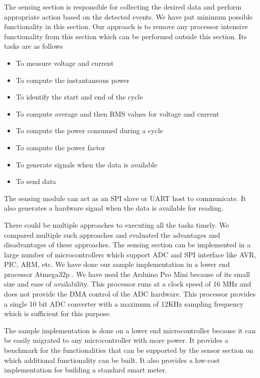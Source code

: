 The sensing section is responsible for collecting the desired data and perform appropriate action based on the detected events. We have put minimum possible functionality in this section. Our approach is to remove any processor intensive functionality from this section which can be performed outside this section. Its tasks are as follows

\begin{itemize}

\item To measure voltage and current
\item To compute the instantaneous power
\item To identify the start and end of the cycle
\item To compute average and then RMS values for voltage and current
\item To compute the power consumed during a cycle
\item To compute the power factor
\item To generate signals when the data is available
\item To send data

\end{itemize}


The sensing module can act as an SPI slave or UART host to communicate. It also generates a hardware signal when the data is available for reading.


There could be multiple approaches to executing all the tasks timely. We compared multiple such approaches and evaluated the advantages and disadvantages of these approaches. The sensing section can be implemented in a large number of microcontrollers which support ADC and SPI interface like AVR, PIC, ARM, etc. We have done our sample implementation in a lower end processor Atmega32p \cite{ATmega328P8bitAVR}. We have used the Arduino Pro Mini because of its small size and ease of availability. This processor runs at a clock speed of 16 MHz and does not provide the DMA control of the ADC hardware. This processor provides a single 10 bit ADC converter with a maximum of 12KHz sampling frequency which is sufficient for this purpose. %

The sample implementation is done on a lower end microcontroller because it can be easily migrated to any microcontroller with more power. It provides a benchmark for the functionalities that can be supported by the sensor section on which additional functionality can be built. It also provides a low-cost implementation for building a standard smart meter.

